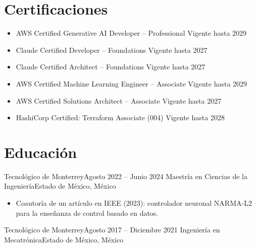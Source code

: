 \documentclass[10pt,letterpaper]{article}
\begin{document}
\section*{Certificaciones}
\begin{itemize}
  \item AWS Certified Generative AI Developer -- Professional \hfill Vigente hasta 2029
  \item Claude Certified Developer -- Foundations \hfill Vigente hasta 2027
  \item Claude Certified Architect -- Foundations \hfill Vigente hasta 2027
  \item AWS Certified Machine Learning Engineer -- Associate \hfill Vigente hasta 2029
  \item AWS Certified Solutions Architect -- Associate \hfill Vigente hasta 2027
  \item HashiCorp Certified: Terraform Associate (004) \hfill Vigente hasta 2028
\end{itemize}

\section*{Educación}

\entry
{Tecnológico de Monterrey}{Agosto 2022 -- Junio 2024}
{Maestría en Ciencias de la Ingeniería}{Estado de México, México}
\begin{itemize}
  \item Coautoría de un artículo en IEEE (2023): controlador neuronal NARMA-L2 para la enseñanza de control basado en datos.
\end{itemize}

\entry
{Tecnológico de Monterrey}{Agosto 2017 -- Diciembre 2021}
{Ingeniería en Mecatrónica}{Estado de México, México}
\end{document}
